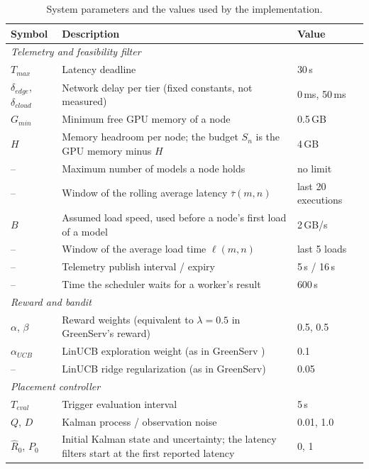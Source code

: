 \begin{table}[htbp]
    \centering
    \footnotesize
    \caption{System parameters and the values used by the implementation.}
    \label{tab:parameters}
    \begin{tabularx}{\textwidth}{l X l}
        \toprule
        \textbf{Symbol} & \textbf{Description} & \textbf{Value} \\
        \midrule
        \multicolumn{3}{l}{\emph{Telemetry and feasibility filter}} \\
        $T_{max}$ & Latency deadline & 30\,s \\
        $\delta_{edge}$, $\delta_{cloud}$ & Network delay per tier (fixed constants, not measured) & 0\,ms, 50\,ms \\
        $G_{min}$ & Minimum free GPU memory of a node & 0.5\,GB \\
        $H$ & Memory headroom per node; the budget $S_n$ is the GPU memory minus $H$ & 4\,GB \\
        -- & Maximum number of models a node holds & no limit \\
        -- & Window of the rolling average latency $\bar{\tau}(m, n)$ & last 20 executions \\
        $B$ & Assumed load speed, used before a node's first load of a model & 2\,GB/s \\
        -- & Window of the average load time $\ell(m, n)$ & last 5 loads \\
        -- & Telemetry publish interval / expiry & 5\,s / 16\,s \\
        -- & Time the scheduler waits for a worker's result & 600\,s \\
        \midrule
        \multicolumn{3}{l}{\emph{Reward and bandit}} \\
        $\alpha$, $\beta$ & Reward weights (equivalent to $\lambda = 0.5$ in GreenServ's reward) & 0.5, 0.5 \\
        $\alpha_{UCB}$ & LinUCB exploration weight (as in GreenServ \cite{greenserv}) & 0.1 \\
        -- & LinUCB ridge regularization (as in GreenServ) & 0.05 \\
        \midrule
        \multicolumn{3}{l}{\emph{Placement controller}} \\
        $T_{eval}$ & Trigger evaluation interval & 5\,s \\
        $Q$, $D$ & Kalman process / observation noise & 0.01, 1.0 \\
        $\hat{R}_0$, $P_0$ & Initial Kalman state and uncertainty; the latency filters start at the first reported latency & 0, 1 \\

\end{tabularx}
\end{table}
